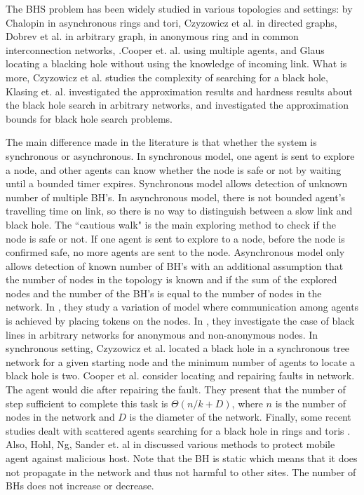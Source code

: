 The BHS problem has been widely studied in various topologies and settings: 
by Chalopin \cite{Das1,Das2} in asynchronous rings and tori, Czyzowicz et al. \cite{czyz} in directed graphs, Dobrev et al. \cite{ dobr} in arbitrary graph, \cite{dobr1} in anonymous ring and \cite{dobr2} in common interconnection networks, .Cooper et. al. \cite{coop} using multiple agents, and Glaus \cite{glau} locating a blacking hole without using the knowledge of incoming link. What is more, Czyzowicz et al. \cite{czyz1} studies the complexity of searching for a black hole, Klasing et. al. \cite{klas} investigated the approximation results and hardness results about the black hole search in arbitrary networks, and \cite{klas1}investigated the approximation bounds for black hole search problems.  

The main difference made in the literature is that whether the system is synchronous or asynchronous. In synchronous model, one agent is sent to explore a node, and other agents can know whether the node is safe or not by waiting until a bounded timer expires. Synchronous model allows detection of unknown number of multiple BH's. In asynchronous model, there is not bounded agent's travelling time on link, so there is no way to distinguish between a slow link and black hole. The ``cautious walk" is the main exploring method to check if the node is safe or not. If one agent is sent to explore to a node, before the node is confirmed safe, no more agents are sent to the node. Asynchronous model only allows detection of known number of BH's with an additional assumption that the number of nodes in the topology is known and if the sum of the explored nodes and the number of the BH's is equal to the number of nodes in the network. In \cite{dobr,dobr1,shi}, they study a variation of model where communication among agents is achieved by placing tokens on the nodes. In \cite{chal2, floc}, they investigate the case of black lines in arbitrary networks for anonymous and non-anonymous nodes. In synchronous setting, Czyzowicz et al.\cite{Czyz2} located a black hole in a synchronous tree network for a given starting node and the minimum number of agents to locate a black hole is two. Cooper et al.\cite{coop1} consider locating  and repairing faults in network. The agent would die after repairing the fault. They present that the number of step sufficient to complete this task is $\Theta(n/k+D)$, where $n$ is the number of nodes in the network and $D$ is the diameter of the network. Finally, some recent studies dealt with scattered agents searching for a black hole in rings and toris \cite{chal,chal1,}. Also, Hohl, Ng, Sander et. al in \cite{ng, hohl1, hohl2, rubi} discussed various methods to protect mobile agent against malicious host. Note that the BH is static which means that it does not propagate in the network and thus not harmful to other sites. The number of BHs does not increase or decrease. 


